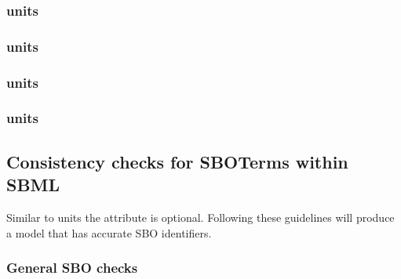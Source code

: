 \subsubsection*{ units} \begin{sbmlenum}


\end{sbmlenum} 

\subsubsection*{ units} \begin{sbmlenum}


\end{sbmlenum} 

\subsubsection*{ units} \begin{sbmlenum}


\end{sbmlenum} 

\subsubsection*{ units} \begin{sbmlenum}


\end{sbmlenum}

\subsection{Consistency checks for SBOTerms within SBML}

Similar to units the  attribute is optional.  Following these
guidelines will produce a model that has accurate SBO identifiers.

\subsubsection*{General SBO checks} \begin{sbmlenum}


\end{sbmlenum}
